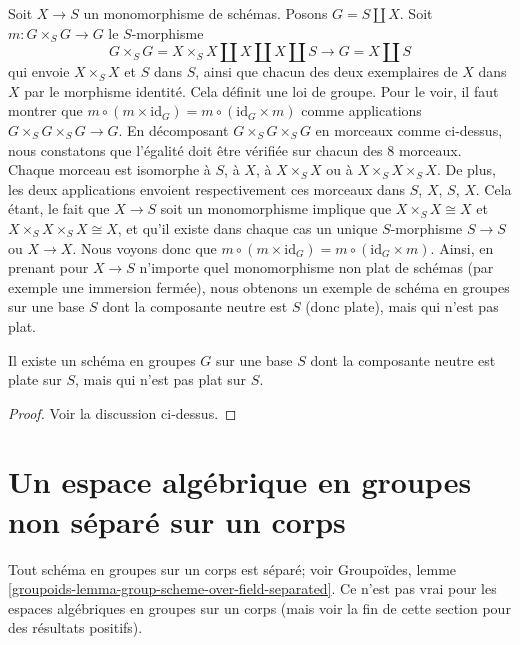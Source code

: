 \noindent
Soit $X \to S$ un monomorphisme de schémas. Posons $G = S \amalg X$.
Soit $m : G \times_S G \to G$ le $S$-morphisme
$$
G \times_S G = X \times_S X \amalg X \amalg X \amalg S
\longrightarrow G = X \amalg S
$$
qui envoie $X \times_S X$ et $S$ dans $S$, ainsi que chacun des
deux exemplaires de $X$ dans $X$ par le morphisme identité.
Cela définit une loi de groupe. Pour le voir, il faut montrer que
$m \circ (m \times \text{id}_G) = m \circ (\text{id}_G \times m)$
comme applications $G \times_S G \times_S G \to G$. En décomposant
$G \times_S G \times_S G$ en morceaux comme ci-dessus, nous constatons que
l'égalité doit être vérifiée sur chacun des $8$ morceaux.
Chaque morceau est isomorphe à $S$, à $X$, à $X \times_S X$ ou à
$X \times_S X \times_S X$. De plus, les deux applications envoient
respectivement ces morceaux dans $S$, $X$, $S$, $X$. Cela étant, le fait que
$X \to S$ soit un monomorphisme implique que $X \times_S X \cong X$
et $X \times_S X \times_S X \cong X$, et qu'il existe dans chaque cas
un unique $S$-morphisme $S \to S$ ou $X \to X$. Nous voyons donc
que $m \circ (m \times \text{id}_G) = m \circ (\text{id}_G \times m)$.
Ainsi, en prenant pour $X \to S$ n'importe quel
monomorphisme non plat de schémas (par exemple une immersion fermée),
nous obtenons un exemple de schéma en groupes
sur une base $S$ dont la composante neutre est $S$ (donc plate),
mais qui n'est pas plat.

\begin{lemma}
\label{lemma-non-flat-group-scheme}
Il existe un schéma en groupes $G$ sur une base $S$ dont la composante
neutre est plate sur $S$, mais qui n'est pas plat sur $S$.
\end{lemma}

\begin{proof}
Voir la discussion ci-dessus.
\end{proof}




\section{Un espace algébrique en groupes non séparé sur un corps}
\label{section-non-separated-group-space}

\noindent
Tout schéma en groupes sur un corps est séparé; voir
Groupoïdes, lemme \ref{groupoids-lemma-group-scheme-over-field-separated}.
Ce n'est pas vrai pour les espaces algébriques en groupes sur un corps
(mais voir la fin de cette section pour des résultats positifs).

